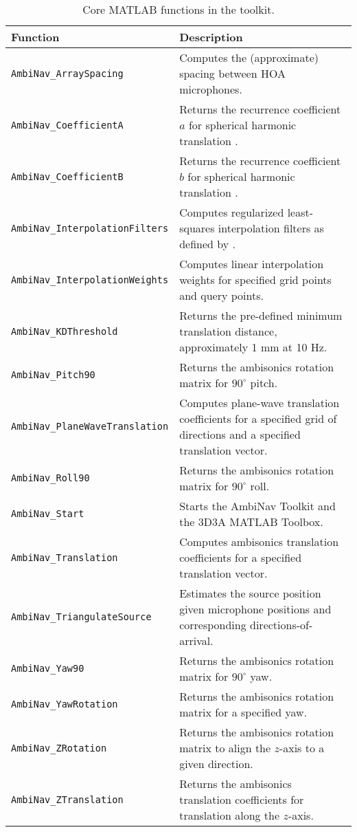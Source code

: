 \documentclass[11pt, oneside]{article}
\begin{document}
\begin{table}
\centering
  \begin{tabular}{| l | p{11cm} |}
    \hline
    \textbf{Function} & \textbf{Description} \\ \hline
    \texttt{AmbiNav\_ArraySpacing} & Computes the (approximate) spacing between HOA microphones. \\ \hline
    \texttt{AmbiNav\_CoefficientA} & Returns the recurrence coefficient $a$ for spherical harmonic translation \citep[Eq. (145)]{Zotter2009PhD}. \\ \hline
    \texttt{AmbiNav\_CoefficientB} & Returns the recurrence coefficient $b$ for spherical harmonic translation \citep[Eq. (146)]{Zotter2009PhD}. \\ \hline
    \texttt{AmbiNav\_InterpolationFilters} & Computes regularized least-squares interpolation filters as defined by \citet{TylkaChoueiri2016}. \\ \hline
    \texttt{AmbiNav\_InterpolationWeights} & Computes linear interpolation weights for specified grid points and query points. \\ \hline
    \texttt{AmbiNav\_KDThreshold} & Returns the pre-defined minimum translation distance, approximately 1 mm at 10 Hz. \\ \hline
    \texttt{AmbiNav\_Pitch90} & Returns the ambisonics rotation matrix for $90^\circ$ pitch. \\ \hline
    \texttt{AmbiNav\_PlaneWaveTranslation} & Computes plane-wave translation coefficients for a specified grid of directions and a specified translation vector. \\ \hline
    \texttt{AmbiNav\_Roll90} & Returns the ambisonics rotation matrix for $90^\circ$ roll. \\ \hline
    \texttt{AmbiNav\_Start} & Starts the AmbiNav Toolkit and the 3D3A MATLAB Toolbox. \\ \hline
    \texttt{AmbiNav\_Translation} & Computes ambisonics translation coefficients for a specified translation vector. \\ \hline
    \texttt{AmbiNav\_TriangulateSource} & Estimates the source position given microphone positions and corresponding directions-of-arrival. \\ \hline
    \texttt{AmbiNav\_Yaw90} & Returns the ambisonics rotation matrix for $90^\circ$ yaw. \\ \hline
    \texttt{AmbiNav\_YawRotation} & Returns the ambisonics rotation matrix for a specified yaw. \\ \hline
    \texttt{AmbiNav\_ZRotation} & Returns the ambisonics rotation matrix to align the $z$-axis to a given direction. \\ \hline
    \texttt{AmbiNav\_ZTranslation} & Returns the ambisonics translation coefficients for translation along the $z$-axis. \\ \hline
    \end{tabular}
    \caption{Core MATLAB functions in the toolkit.}
    \label{tab:Functions}
\end{table}
\end{document}
